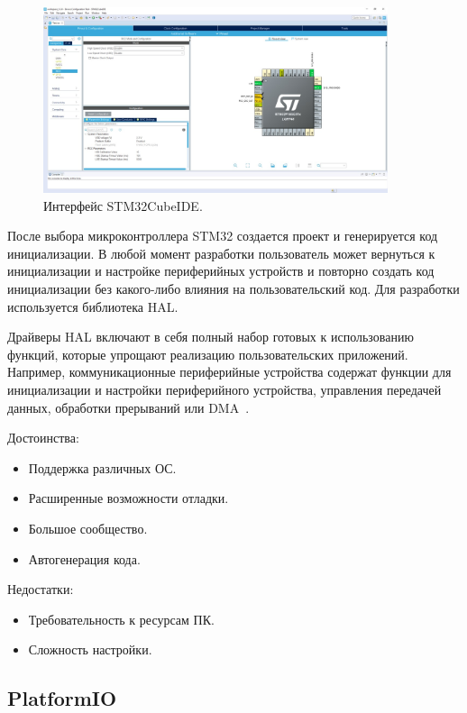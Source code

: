 	\begin{figure}[h]
    \centering
    \includegraphics[width=0.9\textwidth]{../image/cube.jpg}
    \caption{Интерфейс STM32CubeIDE.}
	\end{figure}
	
	После выбора микроконтроллера STM32 создается проект и генерируется код инициализации. В любой момент разработки пользователь может вернуться к инициализации и настройке периферийных устройств и повторно создать код инициализации без какого-либо влияния на пользовательский код. Для разработки используется библиотека HAL. 
	
	Драйверы HAL включают в себя полный набор готовых к использованию функций, которые упрощают реализацию пользовательских приложений. Например, коммуникационные периферийные устройства содержат функции для инициализации и настройки периферийного устройства, управления передачей данных, обработки прерываний или DMA~\cite{hal}.
	
	Достоинства:
	\begin{itemize}
		\item Поддержка различных ОС.
		\item Расширенные возможности отладки.
		\item Большое сообщество.
		\item Автогенерация кода.
	\end{itemize}
	
	Недостатки:
	\begin{itemize}
		\item Требовательность к ресурсам ПК.
		\item Сложность настройки.
	\end{itemize}

\subsection{PlatformIO}

